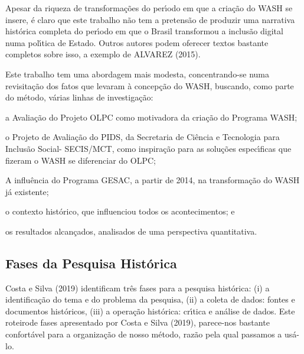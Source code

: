 \documentclass[
12pt,		%
openright,	%
twoside,  %
a4paper,			%
chapter=TITLE,		%
english,			%
french,				%
spanish,			%
brazil				%
]{USPSC-classe/USPSC}
\begin{document}
Apesar da riqueza de transforma\c{c}\~oes do per\'{\i}odo em que a cria\c{c}\~ao do WASH se insere, \'e claro que este trabalho n\~ao tem a pretens\~ao de produzir uma narrativa hist\'orica completa do per\'{\i}odo em que o Brasil transformou a inclus\~ao digital numa pol\'{\i}tica de Estado. Outros autores podem oferecer textos bastante completos sobre isso, a exemplo de  ALVAREZ (2015).








Este trabalho tem uma abordagem mais modesta, concentrando-se numa revisita\c{c}\~ao dos fatos que levaram \`a concep\c{c}\~ao do WASH, buscando, como parte do m\'etodo, v\'arias linhas de investiga\c{c}\~ao:









\begin{alineas}
\item a Avalia\c{c}\~ao do Projeto OLPC como motivadora da cria\c{c}\~ao do Programa WASH;
\item o Projeto de Avalia\c{c}\~ao do PIDS, da Secretaria de Ci\^encia e Tecnologia para Inclus\~ao Social- SECIS/MCT, como inspira\c{c}\~ao para as solu\c{c}\~oes espec\'{\i}ficas que fizeram o WASH se diferenciar do OLPC;
\item A influ\^encia do Programa GESAC, a partir de 2014, na transforma\c{c}\~ao do WASH j\'a existente;
\item o contexto hist\'orico, que influenciou todos os acontecimentos; e
\item os resultados alcan\c{c}ados, analisados de uma perspectiva quantitativa.
\end{alineas}

\subsection[Fases da Pesquisa Hist\'orica]{Fases da Pesquisa Hist\'orica}\label{Fases da Pesquisa Hist\'orica}
Costa e Silva (2019) identificam tr\^es fases para a pesquisa hist\'orica: (i) a identifica\c{c}\~ao do tema e do problema da pesquisa, (ii) a coleta de dados: fontes e documentos hist\'oricos, (iii) a opera\c{c}\~ao hist\'orica: cr\'{\i}tica e an\'alise de dados. Este \textquotedbl roteiro\textquotedbl  de fases apresentado por  Costa e Silva (2019), parece-nos bastante confort\'avel para a organiza\c{c}\~ao de nosso m\'etodo, raz\~ao pela qual passamos a us\'a-lo.
\end{document}
